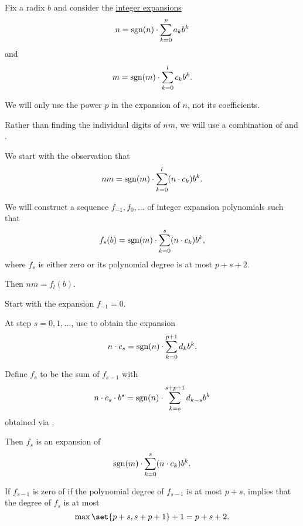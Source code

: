 \begin{algorithm}\label{alg:multi_digit_mult_with_carrying}
  Fix a radix \( b \) and consider the \hyperref[def:integer_radix_expansion]{integer expansions}
  \begin{equation*}
    n = \operatorname{sgn}(n) \cdot \sum_{k=0}^p a_k b^k
  \end{equation*}
  and
  \begin{equation*}
    m = \operatorname{sgn}(m) \cdot \sum_{k=0}^l c_k b^k.
  \end{equation*}

  We will only use the power \( p \) in the expansion of \( n \), not its coefficients.

  Rather than finding the individual digits of \( nm \), we will use a combination of  and .

  We start with the observation that
  \begin{equation*}
    nm = \operatorname{sgn}(m) \cdot \sum_{k=0}^l (n \cdot c_k) b^k.
  \end{equation*}

  We will construct a sequence \( f_{-1}, f_0, \ldots \) of integer expansion polynomials such that
  \begin{equation*}
    f_s(b) = \operatorname{sgn}(m) \cdot \sum_{k=0}^s (n \cdot c_k) b^k,
  \end{equation*}
  where \( f_s \) is either zero or its polynomial degree is at most \( p + s + 2 \).

  Then \( nm = f_l(b) \).

  \begin{thmenum}
     Start with the expansion \( f_{-1} = 0 \).

     At step \( s = 0, 1, \ldots \), use  to obtain the expansion
    \begin{equation*}
      n \cdot c_s = \operatorname{sgn}(n) \cdot \sum_{k=0}^{p + 1} d_k b^k.
    \end{equation*}

    Define \( f_s \) to be the sum of \( f_{s-1} \) with
    \begin{equation*}
      n \cdot c_s \cdot b^s = \operatorname{sgn}(n) \cdot \sum_{k=s}^{s + p + 1} d_{k - s} b^k
    \end{equation*}
    obtained via .

    Then \( f_s \) is an expansion of
    \begin{equation*}
      \operatorname{sgn}(m) \cdot \sum_{k=0}^s (n \cdot c_k) b^k.
    \end{equation*}

    If \( f_{s-1} \) is zero of if the polynomial degree of \( f_{s-1} \) is at most \( p + s \),  implies that the degree of \( f_s \) is at most
    \begin{equation*}
      \max\set{ p + s, s + p + 1 } + 1 = p + s + 2.
    \end{equation*}
  \end{thmenum}
\end{algorithm}
